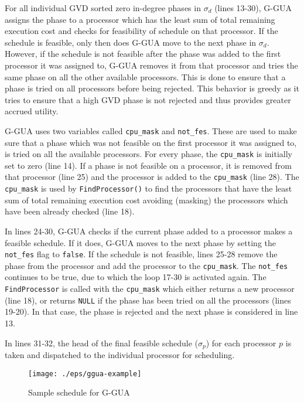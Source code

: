 \documentclass[12pt,dvips]{report}
\begin{document}
For all individual GVD sorted zero in-degree phases in $\sigma_d$ (lines 13-30), G-GUA assigns the phase to a processor which has the least sum of total remaining execution cost and checks for feasibility of schedule on that processor. If the schedule is feasible, only then does G-GUA move to the next phase in $\sigma_d$. However, if the schedule is not feasible after the phase was added to the first processor it was assigned to, G-GUA removes it from that processor and tries the same phase on all the other available processors. This is done to ensure that a phase is tried on all processors before being rejected. This behavior is greedy as it tries to ensure that a high GVD phase is not rejected and thus provides greater accrued utility.

G-GUA uses two variables called \texttt{cpu\_mask} and \texttt{not\_fes}. These are used to make sure that a phase which was not feasible on the first processor it was assigned to, is tried on all the available processors. For every phase, the \texttt{cpu\_mask} is initially set to zero (line 14). If a phase is not feasible on a processor, it is removed from that processor (line 25) and the processor is added to the \texttt{cpu\_mask} (line 28). The \texttt{cpu\_mask} is used by \texttt{FindProcessor()} to find the processors that have the least sum of total remaining execution cost avoiding (masking) the processors which have been already checked (line 18).

In lines 24-30, G-GUA checks if the current phase added to a processor makes a feasible schedule. If it does, G-GUA moves to the next phase by setting the \texttt{not\_fes} flag to \texttt{false}. If the schedule is not feasible, lines 25-28 remove the phase from the processor and add the processor to the \texttt{cpu\_mask}. The \texttt{not\_fes} continues to be true, due to which the loop 17-30 is activated again. The \texttt{FindProcessor} is called with the \texttt{cpu\_mask} which either returns a new processor (line 18), or returns \texttt{NULL} if the phase has been tried on all the processors (lines 19-20). In that case, the phase is rejected and the next phase is considered in line 13.

In lines 31-32, the head of the final feasible schedule ($\sigma_p$) for each processor $p$ is taken and dispatched to the individual processor for scheduling.

\begin{figure} [htbp]
  \centering
  \texttt{[image: ./eps/ggua-example]}
  \caption{Sample schedule for G-GUA}
  \label{fig:ggua-sample-sched}
\end{figure}
\end{document}

